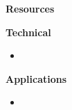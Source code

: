 \begin{frame}\begin{center}
		\LARGE\textbf{Resources}
\end{center}\end{frame}

\begin{frame}[allowframebreaks]\textbf{Technical}\vspace{0.3cm}

\begin{itemize}\small
\item {}
\end{itemize}

\end{frame}
\begin{frame}[allowframebreaks]\textbf{Applications}\vspace{0.3cm}

\begin{itemize}\small
\item {}
\end{itemize}

\end{frame}
